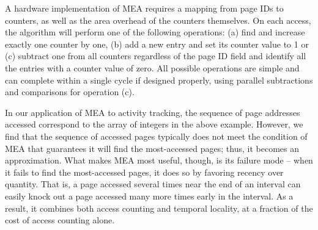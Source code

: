 A hardware implementation of MEA requires a mapping from page IDs to counters, as well as the area overhead of the counters themselves. On each access, the algorithm will perform one of the following operations: (a) find and increase exactly one counter by one, (b) add a new entry and set its counter value to 1 or (c) subtract one from all counters regardless of the page ID field and identify all the entries with a counter value of zero. All possible operations are simple and can complete within a single cycle if designed properly, using parallel subtractions and comparisons for operation (c).



In our application of MEA to activity tracking, the sequence of page addresses accessed correspond to the array of integers in the above example. 
However, we find that the sequence of accessed pages typically does not
meet the condition of MEA that guarantees it will find the most-accessed
pages; thus, it becomes an approximation.  What makes MEA most useful,
though, is its failure mode -- when it fails to find the most-accessed pages,
it does so by favoring recency over quantity.  That is, a page accessed several
times near the end of an interval can easily knock out a page accessed many
more times early in the interval.  As a result, it combines both access
counting and temporal locality, at a fraction of the cost of access counting
alone.


